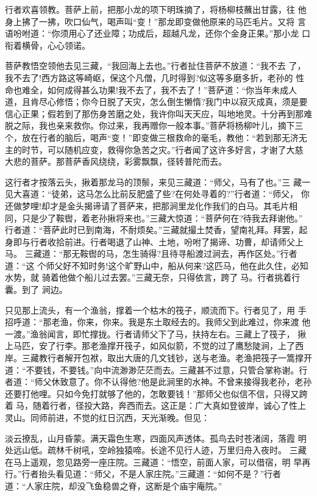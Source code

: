 行者欢喜领教。菩萨上前，把那小龙的项下明珠摘了，将杨柳枝蘸出甘露，往
他身上拂了一拂，吹口仙气，喝声叫“变！”那龙即变做他原来的马匹毛片。又将
言语吩咐道：“你须用心了还业障；功成后，超越凡龙，还你个金身正果。”那小龙
口衔着横骨，心心领诺。

菩萨教悟空领他去见三藏，“我回海上去也。”行者扯住菩萨不放道：“我不去
了，我不去了!西方路这等崎岖，保这个凡僧，几时得到?似这等多磨多折，老孙的
性命也难全，如何成得甚么功果!我不去了，我不去了！”菩萨道：“你当年未成人
道，且肯尽心修悟；你今日脱了天灾，怎么倒生懒惰?我门中以寂灭成真，须是要
信心正果；假若到了那伤身苦磨之处，我许你叫天天应，叫地地灵。十分再到那难
脱之际，我也亲来救你。你过来，我再赠你一般本事。”菩萨将杨柳叶儿，摘下三
个，放在行者的脑后，喝声“变！”即变做三根救命的毫毛，教他：“若到那无济无
主的时节，可以随机应变，救得你急苦之灾。”行者闻了这许多好言，才谢了大慈
大悲的菩萨。那菩萨香风绕绕，彩雾飘飘，径转普陀而去。

这行者才按落云头，揪着那龙马的顶鬃，来见三藏道：“师父，马有了也。”三
藏一见大喜道：“徒弟，这马怎么比前反肥盛了些?在何处寻着的?”行者道：“师父，
你还做梦哩!却才是金头揭谛请了菩萨来，把那涧里龙化作我们的白马。其毛片相
同，只是少了鞍辔，着老孙揪将来也。”三藏大惊道：“菩萨何在?待我去拜谢他。”
行者道：“菩萨此时已到南海，不耐烦矣。”三藏就撮土焚香，望南礼拜。拜罢，起
身即与行者收拾前进。行者喝退了山神、土地，吩咐了揭谛、功曹，却请师父上马。
三藏道：“那无鞍辔的马，怎生骑得?且待寻船渡过涧去，再作区处。”行者道：“这
个师父好不知时务!这个旷野山中，船从何来?这匹马，他在此久住，必知水势，就
骑着他做个船儿过去罢。”三藏无奈，只得依言，跨了马。行者挑着行囊。到了
涧边。

只见那上流头，有一个渔翁，撑着一个枯木的筏子，顺流而下。行者见了，用
手招呼道：“那老渔，你来，你来。我是东土取经去的。我师父到此难过，你来渡
他一渡。”渔翁闻言，即忙撑拢。行者请师父下了马，扶持左右。三藏上了筏子，
揪上马匹，安了行李。那老渔撑开筏子，如风似箭，不觉的过了鹰愁陡涧，上了西
岸。三藏教行者解开包袱，取出大唐的几文钱钞，送与老渔。老渔把筏子一篙撑开
道：“不要钱，不要钱。”向中流渺渺茫茫而去。三藏甚不过意，只管合掌称谢。行
者道：“师父休致意了。你不认得他?他是此涧里的水神。不曾来接得我老孙，老孙
还要打他哩。只如今免打就够了他的，怎敢要钱！”那师父也似信不信，只得又跨
着马，随着行者，径投大路，奔西而去。这正是：广大真如登彼岸，诚心了性上
灵山。同师前进，不觉的红日沉西，天光渐晚。但见：

淡云撩乱，山月昏蒙。满天霜色生寒，四面风声透体。孤鸟去时苍渚阔，落霞
明处远山低。疏林千树吼，空岭独猿啼。长途不见行人迹，万里归舟入夜时。
三藏在马上遥观，忽见路旁一座庄院。三藏道：“悟空，前面人家，可以借宿，明
早再行。”行者抬头看见道：“师父，不是人家庄院。”三藏道：“如何不是？”行者
道：“人家庄院，却没飞鱼稳兽之脊，这断是个庙宇庵院。”


